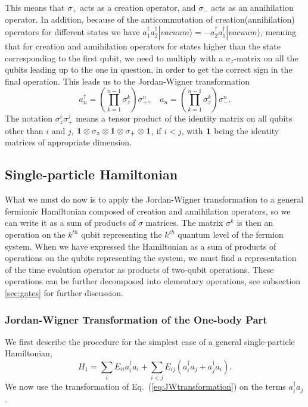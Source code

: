 This means that $\sigma_+$ acts as a creation operator, and $\sigma_-$
acts as an annihilation operator. In addition, because of the
anticommutation of creation(annihilation)  operators for different states we have 
$a_1^\dag a_2^\dag
|vacuum\rangle = - a_2^\dag a_1^\dag |vacuum\rangle$, meaning that for creation and
annihilation operators for states higher than the state corresponding
to the first qubit, we need to multiply with a $\sigma_z$-matrix on
all the qubits leading up to the one in question, in order  to get the correct
sign in the final operation. This leads us to the Jordan-Wigner
transformation \cite{somma2002,ortiz2002}
\begin{equation}
\label{eq:JWtransformation}
a^\dag_n = \left(\prod_{k=1}^{n-1} \sigma_z^k\right) \sigma_+^n, \quad 
a_n = \left(\prod_{k=1}^{n-1} \sigma_z^k\right) \sigma_-^n.
\end{equation}
The notation $\sigma_z^i\sigma_+^j$ means a tensor product of the
identity matrix on all qubits other than $i$ and $j$, ${\bf 1}\otimes
\sigma_z \otimes {\bf 1} \otimes \sigma_+\otimes{\bf 1}$, if $i<j$, with ${\bf 1}$
being the  identity matrices of appropriate dimension.





\subsection{Single-particle Hamiltonian}
\label{sec:1partH}
What we must do now is to apply the Jordan-Wigner transformation to a
general fermionic Hamiltonian composed of creation and annihilation
operators, so we can write it as a sum of products of $\sigma$
matrices. The matrix $\sigma^k$ is then an operation on the $k^{th}$
qubit representing the $k^{th}$ quantum level of the fermion system.
When we have expressed the Hamiltonian as a sum of products of
operations on the qubits representing the system, we must find a
representation of the time evolution operator as products of two-qubit
operations. These operations can be further decomposed into elementary
operations, see subsection \ref{sec:gates} for further discussion.


\subsubsection{Jordan-Wigner Transformation of the One-body Part}
We first describe the procedure for the 
simplest case of a general single-particle Hamiltonian,
\begin{equation}
H_1=\sum_{i} E_{ii} a^\dag_i a_i +
\sum_{i<j} E_{ij} (a^\dag_i a_j + a^\dag_j a_i).
\end{equation} 
We now  use the transformation  of  
Eq.~(\ref{eq:JWtransformation}) on the terms $a^\dag_i a_j$. 

